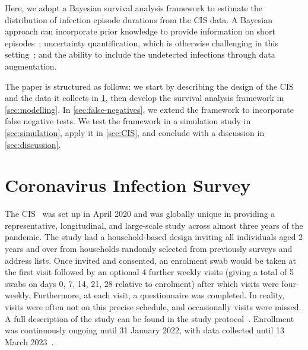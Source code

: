 \documentclass[referee,useAMS,usenatbib]{biom}
\makeatletter
\DeclareRobustCommand\onedot{\futurelet\@let@token\@onedot}
\def\@onedot{\ifx\@let@token.\else.\null\fi\xspace}
\def\eg{e.g\onedot} \def\Eg{{E.g}\onedot}
\makeatother
\begin{document}
Here, we adopt a Bayesian survival analysis framework to estimate the distribution of infection episode durations from the CIS data.
A Bayesian approach can incorporate prior knowledge to provide information on short episodes~\citep{caoBias}; uncertainty quantification, which is otherwise challenging in this setting~\citep{sunStatistical,dengNonparametric}; and the ability to include the undetected infections through data augmentation.

The paper is structured as follows: we start by describing the design of the CIS and the data it collects in \cref{sec:data}, then develop the survival analysis framework in \cref{sec:modelling}.
In \cref{sec:false-negatives}, we extend the framework to incorporate false negative tests.
We test the framework in a simulation study in \cref{sec:simulation}, apply it in \cref{sec:CIS}, and conclude with a discussion in \cref{sec:discussion}.


\section{Coronavirus Infection Survey} \label{sec:data}

The CIS~\citep{CIS} was set up in April 2020 and was globally unique in providing a representative, longitudinal, and large-scale study across almost three years of the pandemic.
The study had a household-based design inviting all individuals aged 2 years and over from households randomly selected from previously surveys and address lists.
Once invited and consented, an enrolment swab would be taken at the first visit followed by an optional 4 further weekly visits (giving a total of 5 swabs on days 0, 7, 14, 21, 28 relative to enrolment) after which visits were four-weekly. Furthermore, at each visit, a questionnaire was completed.  In reality, visits were often not on this precise schedule, and occasionally visits were missed. %
A full description of the study can be found in the study protocol~\citep{cisProtocol}.
Enrollment was continuously ongoing until 31 January 2022, with data collected until 13 March 2023~\citep{weiRisk}. 
\end{document}
